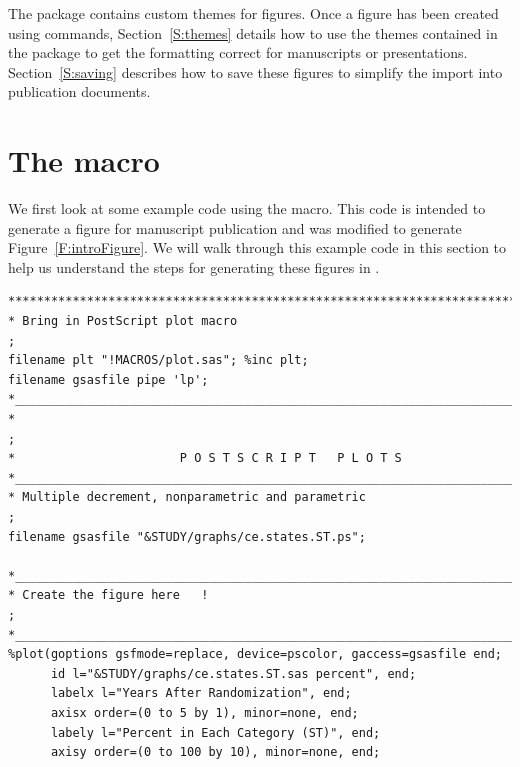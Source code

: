 \documentclass[nojss, letterpaper]{jss}\usepackage[]{graphicx}\usepackage[]{color}
\begin{document}
The  package contains custom themes for figures. Once a figure has been created using  commands, Section~\ref{S:themes} details how to use the themes contained in the  package to get the formatting correct for manuscripts or presentations. Section~\ref{S:saving} describes how to save these figures to simplify the import into publication documents.


\section[The plot.sas macro]{The  macro}\label{S:plot.sas}

We first look at some example code using the  macro. This code is intended to generate a figure for manuscript publication and was modified to generate Figure~\ref{F:introFigure}. We will walk through this example code in this section to help us understand the steps for generating these figures in .

\begin{lstlisting}[float,floatplacement=!htpb, caption={plot.sas commands: Figure setup.},label={plot.sas:figureSetup}]
%let STUDY=/studies/cardiac/valves/aortic/replacement/partner_publication_office/partner1b/mortality_5y
*****************************************************************************;
* Bring in PostScript plot macro                                             ;
filename plt "!MACROS/plot.sas"; %inc plt;
filename gsasfile pipe 'lp';
*____________________________________________________________________________;
*                                                                            ;
*                       P O S T S C R I P T   P L O T S
*____________________________________________________________________________;
* Multiple decrement, nonparametric and parametric                           ;
filename gsasfile "&STUDY/graphs/ce.states.ST.ps";

*____________________________________________________________________________;
* Create the figure here   !                                                 ;
*____________________________________________________________________________;
%plot(goptions gsfmode=replace, device=pscolor, gaccess=gsasfile end;
      id l="&STUDY/graphs/ce.states.ST.sas percent", end;
      labelx l="Years After Randomization", end;
      axisx order=(0 to 5 by 1), minor=none, end;
      labely l="Percent in Each Category (ST)", end;
      axisy order=(0 to 100 by 10), minor=none, end;
\end{lstlisting}
\end{document}
